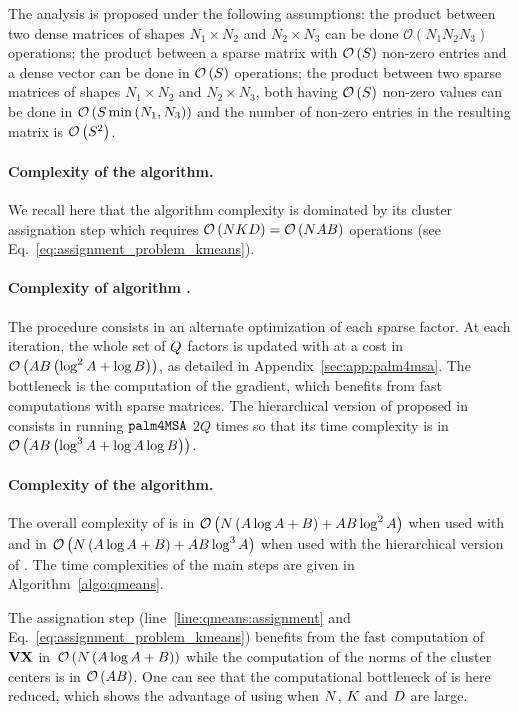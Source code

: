 The analysis is proposed under the following assumptions: the product between two dense matrices of shapes ${N_1\times N_2}$ and ${N_2\times N_3}$ can be done $\mathcal{O}\left (N_1 N_2 N_3 \right )$ operations; 
the product between a sparse matrix with $\mathcal{O}\left(S\right)$ non-zero entries and a dense vector can be done in $\mathcal{O}\left(S\right)$ operations; 
the product between two sparse matrices of shapes ${N_1\times N_2}$ and ${N_2\times N_3}$, both having $\mathcal{O}\left(S\right)$ non-zero values can be done in $\mathcal{O}\left(S \min\left (N_1, N_3\right )\right)$ and the number of non-zero entries in the resulting matrix is $\mathcal{O}\left(S^2\right)$.


\paragraph{Complexity of the \kmeans algorithm.}
We recall here that the \kmeans algorithm complexity is dominated by its cluster assignation step which requires $\mathcal{O}\left(NKD\right)=\mathcal{O}\left(N A B\right)$ operations (see Eq.~\eqref{eq:assignment_problem_kmeans}).

\paragraph{Complexity of algorithm \palm.} The procedure consists in an alternate optimization of each sparse factor. 
At each iteration, the whole set of $Q$ factors is updated with at a cost in $\mathcal{O}\left(AB\left (\log^2 A+\log B\right )\right)$, as detailed in Appendix~\ref{sec:app:palm4msa}. 
The bottleneck is the computation of the gradient, which benefits from fast computations with sparse matrices.
The hierarchical version of \palm proposed in~\cite{LeMagoarou2016Flexible} consists in running $\texttt{palm4MSA}$ $2Q$ times so that its time complexity is in $\mathcal{O}\left(AB\left (\log^3 A + \log A \log B\right )\right)$.


\paragraph{Complexity of the \qkmeans algorithm.} The overall complexity of \qkmeans is in $\mathcal{O}\left(N\left(A\log A+B\right ) + AB \log^2 A\right)$ when used with \palm and in $\mathcal{O}\left(N\left(A\log A+B\right ) + AB \log^3 A\right)$ when used with the hierarchical version of \palm. The time complexities of the main steps are given in Algorithm~\ref{algo:qmeans}. 

The assignation step (line~\ref{line:qmeans:assignment} and Eq.~\eqref{eq:assignment_problem_kmeans}) benefits from the fast computation of ${\mathbf{V}} {\mathbf{X}}$ in~$\mathcal{O}\left(N\left(A\log A+B\right )\right)$ while the computation of the norms of the cluster centers is in $\mathcal{O}\left(AB\right)$.
One can see that the computational bottleneck of \kmeans is here reduced, which shows the advantage of using \qkmeans when $N$, $K$ and $D$ are large.

